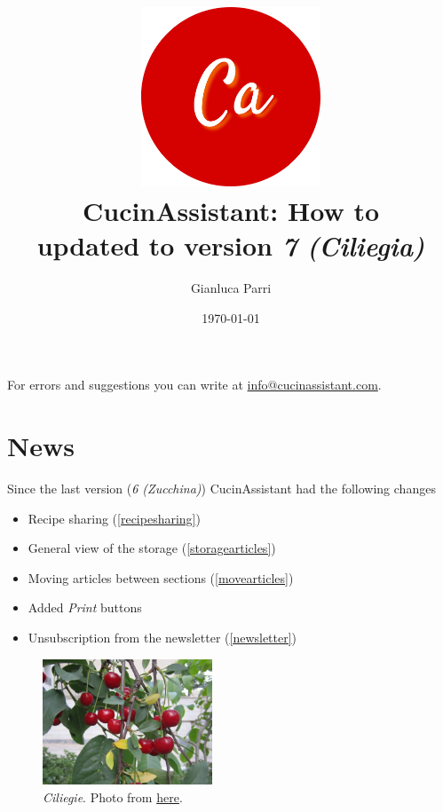 \documentclass[12pt, a4paper]{report}
\begin{document}
    \title{
        \includegraphics[width=0.4\textwidth]{assets/logo.png}\\
        [1cm]CucinAssistant: How to\\
        \large updated to version \emph{7 (Ciliegia)}
    }
    \author{Gianluca Parri}
    \date{\today}
    \maketitle



    \tableofcontents
    \vfill
    \noindent For errors and suggestions you can write at \href{mailto:info@cucinassistant.com}{\mbox{info@cucinassistant.com}}.



    \chapter{News}
    
    Since the last version (\emph{6 (Zucchina)}) CucinAssistant had the following changes

    \begin{itemize}
		\item Recipe sharing (\ref{recipesharing})
		\item General view of the storage (\ref{storagearticles})
		\item Moving articles between sections (\ref{movearticles})
		\item Added \emph{Print} buttons
		\item Unsubscription from the newsletter (\ref{newsletter})
    \end{itemize}

    \begin{figure}[H]
        \centering
        \includegraphics[width=0.45\textwidth]{assets/ciliegie.jpg}
		\caption{\emph{Ciliegie}. Photo from \href{https://upload.wikimedia.org/wikipedia/commons/9/94/Black_Che.jpg}{here}.}
    \end{figure}
\end{document}
